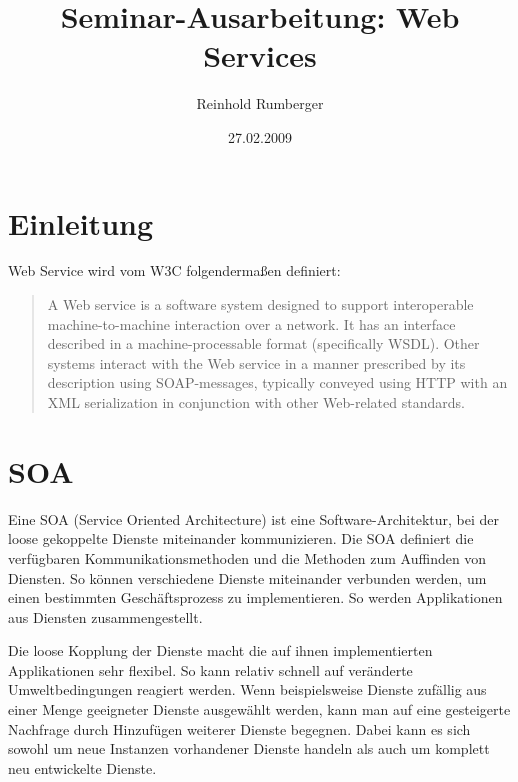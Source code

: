 \documentclass[runningheads]{llncs}
\author{Reinhold Rumberger}
\institute{Institute of Architecture of Application Systems (IAAS)
  \email{rumberrd@studi.informatik.uni-stuttgart.de}}
\title{Seminar-Ausarbeitung: Web Services}
\date{27.02.2009}
\begin{document}
  \frontmatter
  \pagestyle{headings}

  \maketitle
  \tableofcontents
  \mainmatter

  \section{Einleitung}
  \nocite{wk_ws}
    \glqq{}Web Service\grqq{} wird vom W3C folgendermaßen definiert:
    \begin{quote}
      A Web service is a software system designed to support interoperable machine-to-machine interaction over a network. It has an interface described in a machine-processable format (specifically WSDL). Other systems interact with the Web service in a manner prescribed by its description using SOAP-messages, typically conveyed using HTTP with an XML serialization in conjunction with other Web-related standards.\cite{w3c_wsgloss_ws}
    \end{quote}



  \section{SOA}
  \nocite{wk_soa}
    Eine \glqq{}SOA\grqq{} (Service Oriented Architecture) ist eine Software-Architektur, bei der loose gekoppelte Dienste miteinander kommunizieren. Die SOA definiert die verfügbaren Kommunikationsmethoden und die Methoden zum Auffinden von Diensten. So können verschiedene Dienste miteinander verbunden werden, um einen bestimmten Geschäftsprozess zu implementieren. So werden Applikationen aus Diensten zusammengestellt.

    Die loose Kopplung der Dienste macht die auf ihnen implementierten Applikationen sehr flexibel. So kann relativ schnell auf veränderte Umweltbedingungen reagiert werden. Wenn beispielsweise Dienste zufällig aus einer Menge geeigneter Dienste ausgewählt werden, kann man auf eine gesteigerte Nachfrage durch Hinzufügen weiterer Dienste begegnen. Dabei kann es sich sowohl um neue Instanzen vorhandener Dienste handeln als auch um komplett neu entwickelte Dienste.

\end{document}

